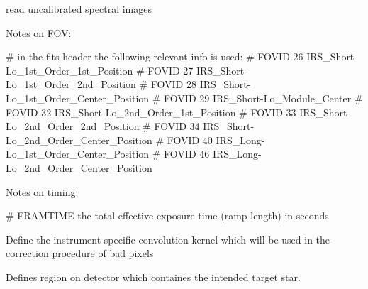 \documentclass[a4paper,11pt,english]{sphinxmanual}
\begin{document}
\begin{fulllineitems}

\begin{fulllineitems}
\label{\detokenize{cascade.instruments:cascade.instruments.instruments.SpitzerIRS.get_spectral_images}}
read uncalibrated spectral images

Notes on FOV:

\# in the fits header the following relevant info is used:
\# FOVID     26     IRS\_Short-Lo\_1st\_Order\_1st\_Position
\# FOVID     27     IRS\_Short-Lo\_1st\_Order\_2nd\_Position
\# FOVID     28     IRS\_Short-Lo\_1st\_Order\_Center\_Position
\# FOVID     29     IRS\_Short-Lo\_Module\_Center
\# FOVID     32     IRS\_Short-Lo\_2nd\_Order\_1st\_Position
\# FOVID     33     IRS\_Short-Lo\_2nd\_Order\_2nd\_Position
\# FOVID     34     IRS\_Short-Lo\_2nd\_Order\_Center\_Position
\# FOVID     40     IRS\_Long-Lo\_1st\_Order\_Center\_Position
\# FOVID     46     IRS\_Long-Lo\_2nd\_Order\_Center\_Position

Notes on timing:

\# FRAMTIME the total effective exposure time (ramp length) in seconds

\end{fulllineitems}


\begin{fulllineitems}
\label{\detokenize{cascade.instruments:cascade.instruments.instruments.SpitzerIRS._define_convolution_kernel}}
Define the instrument specific convolution kernel which will be used
in the correction procedure of bad pixels

\end{fulllineitems}


\begin{fulllineitems}
\label{\detokenize{cascade.instruments:cascade.instruments.instruments.SpitzerIRS._define_region_of_interest}}
Defines region on detector which containes the intended target star.


\end{fulllineitems}
\end{fulllineitems}
\end{document}

